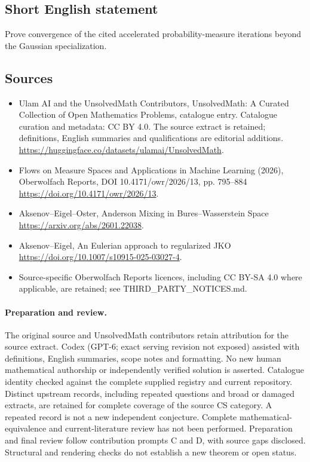 \documentclass[11pt]{article}
\begin{document}
\subsection{Short English statement}
Prove convergence of the cited accelerated probability-measure iterations beyond the Gaussian specialization.
\subsection{Sources}
\begin{itemize}
\item[\hypertarget{source:statement:1}{S1}] Ulam AI and the UnsolvedMath Contributors, UnsolvedMath: A Curated Collection of Open Mathematics Problems, catalogue entry. Catalogue curation and metadata: CC BY 4.0. The source extract is retained; definitions, English summaries and qualifications are editorial additions.
\url{https://huggingface.co/datasets/ulamai/UnsolvedMath}.
\item[\hypertarget{source:statement:2}{S2}] Flows on Measure Spaces and Applications in Machine Learning (2026), Oberwolfach Reports, DOI 10.4171/owr/2026/13, pp. 795--884
\url{https://doi.org/10.4171/owr/2026/13}.
\item[\hypertarget{source:statement:3}{S3}] Aksenov--Eigel--Oster, Anderson Mixing in Bures--Wasserstein Space
\url{https://arxiv.org/abs/2601.22038}.
\item[\hypertarget{source:statement:4}{S4}] Aksenov--Eigel, An Eulerian approach to regularized JKO
\url{https://doi.org/10.1007/s10915-025-03027-4}.
\item Source-specific Oberwolfach Reports licences, including CC BY-SA 4.0 where applicable, are retained; see THIRD\_PARTY\_NOTICES.md.
\end{itemize}
\paragraph{Preparation and review.}
The original source and UnsolvedMath contributors retain attribution for the source extract. Codex (GPT-6; exact serving revision not exposed) assisted with definitions, English summaries, scope notes and formatting. No new human mathematical authorship or independently verified solution is asserted. Catalogue identity checked against the complete supplied registry and current repository. Distinct upstream records, including repeated questions and broad or damaged extracts, are retained for complete coverage of the source CS category. A repeated record is not a new independent conjecture. Complete mathematical-equivalence and current-literature review has not been performed. Preparation and final review follow contribution prompts C and D, with source gaps disclosed. Structural and rendering checks do not establish a new theorem or open status.
\label{end:statement}
\end{document}
